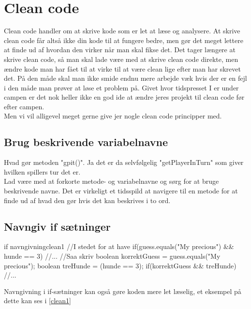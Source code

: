 \chapter{Clean code}

Clean code handler om at skrive kode som er let at læse og analysere. At skrive clean code får altså ikke din kode til at fungere bedre, men gør det meget lettere at finde ud af hvordan den virker når man skal fikse det. Det tager længere at skrive clean code, så man skal lade være med at skrive clean code direkte, men ændre kode man har fået til at virke til at være clean lige efter man har skrevet det. På den måde skal man ikke smide endnu mere arbejde væk hvis der er en fejl i den måde man prøver at løse et problem på. Givet hvor tidspresset I er under campen er det nok heller ikke en god ide at ændre jeres projekt til clean code før efter campen. \\
Men vi vil alligevel meget gerne give jer nogle clean code principper med. 

\section{Brug beskrivende variabelnavne}
Hvad gør metoden "gpit()". Ja det er da selvfølgelig "getPlayerInTurn" som giver hvilken spillers tur det er. \\
Lad være med at forkorte metode- og variabelnavne og sørg for at bruge beskrivende navne. Det er virkeligt et tidsspild at navigere til en metode for at finde ud af hvad den gør hvis det kan beskrives i to ord.

\section{Navngiv if sætninger}
\begin{JavaCode}{if navngivning}{clean1}
	//I stedet for at have
	if(guess.equals("My precious") && hunde == 3){
		//...
	}
	//Saa skriv
	boolean korrektGuess = guess.equals("My precious");
	boolean treHunde = (hunde == 3);
	if(korrektGuess && treHunde){
		//...
	}
\end{JavaCode}
Navngivning i if-sætninger kan også gøre koden mere let læselig, et eksempel på dette kan ses i \autoref{clean1}

